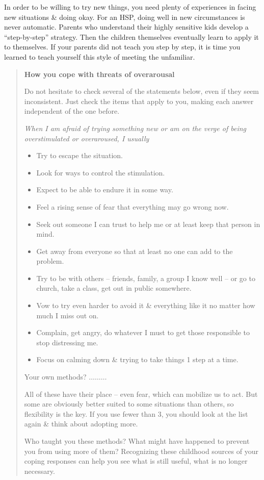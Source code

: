 \documentclass{article}
\numberwithin{equation}{section}
\begin{document}
In order to be willing to try new things, you need plenty of experiences in facing new situations \& doing okay. For an HSP, doing well in new circumstances is never automatic. Parents who understand their highly sensitive kids develop a ``step-by-step'' strategy. Then the children themselves eventually learn to apply it to themselves. If your parents did not teach you step by step, it is time you learned to teach yourself this style of meeting the unfamiliar.
\begin{quotation}
	\textbf{How you cope with threats of overarousal}
	
	Do not hesitate to check several of the statements below, even if they seem inconsistent. Just check the items that apply to you, making each answer independent of the one before.
	
	\textit{When I am afraid of trying something new or am on the verge of being overstimulated or overaroused, I usually}
	\begin{itemize}
		\item Try to escape the situation.
		\item Look for ways to control the stimulation.
		\item Expect to be able to endure it in some way.
		\item Feel a rising sense of fear that everything may go wrong now.
		\item Seek out someone I can trust to help me or at least keep that person in mind.
		\item Get away from everyone so that at least no one can add to the problem.
		\item Try to be with others -- friends, family, a group I know well -- or go to church, take a class, get out in public somewhere.
		\item Vow to try even harder to avoid it \& everything like it no matter how much I miss out on.
		\item Complain, get angry, do whatever I must to get those responsible to stop distressing me.
		\item Focus on calming down \& trying to take things 1 step at a time.
	\end{itemize}
	Your own methods? $\ldots\ldots\ldots$
	
	All of these have their place -- even fear, which can mobilize us to act. But some are obviously better suited to some situations than others, so flexibility is the key. If you use fewer than 3, you should look at the list again \& think about adopting more.
	
	Who taught you these methods? What might have happened to prevent you from using more of them? Recognizing these childhood sources of your coping responses can help you see what is still useful, what is no longer necessary.
\end{quotation}
\end{document}
